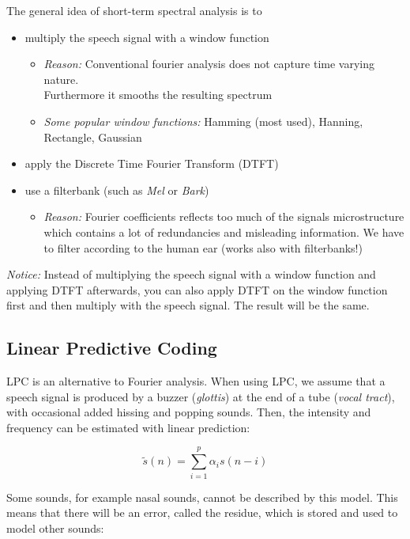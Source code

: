 The general idea of short-term spectral analysis is to

\begin{itemize}
    \item multiply the speech signal with a window function
    \begin{itemize}
    \item \emph{Reason:} Conventional fourier analysis does not capture time varying nature. \\ Furthermore it smooths the resulting spectrum
    \item \emph{Some popular window functions:} Hamming (most used), Hanning, Rectangle, Gaussian
    \end{itemize}

    \item apply the Discrete Time Fourier Transform (DTFT)
    \item use a filterbank (such as \textit{Mel} or \textit{Bark})
    \begin{itemize}
    \item \emph{Reason:} Fourier coefficients reflects too much of the signals microstructure which contains a lot of redundancies and misleading information. We have to filter according to the human ear (works also with filterbanks!)
    \end{itemize}

\end{itemize}

\emph{Notice:} Instead of multiplying the speech signal with a window function and applying DTFT afterwards, you can also apply DTFT on the window function first and then multiply with the speech signal. The result will be the same.
\subsection{Linear Predictive Coding}

LPC is an alternative to Fourier analysis. When using LPC, we assume that a speech signal is produced by a buzzer (\textit{glottis}) at the end of a tube (\textit{vocal tract}), with occasional added hissing and popping sounds. Then, the intensity and frequency can be estimated with linear prediction:

\begin{equation}
    \tilde{s}(n) = \sum\limits_{i = 1}^p \alpha_i s(n - i)
\end{equation}

Some sounds, for example nasal sounds, cannot be described by this model. This means that there will be an error, called the residue, which is stored and used to model other sounds:

